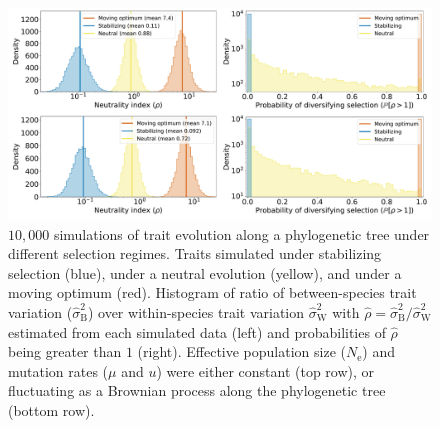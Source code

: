 \documentclass{article}
\newcommand{\Ne}{N_{\text{e}}}
\newcommand{\MutationRatePheno}{\mu}
\newcommand{\MutationRateNuc}{u}
\newcommand{\RateBetween}{\sigma^2_{\mathrm{B}}}
\newcommand{\RateWhithin}{\sigma^2_{\mathrm{W}}}
\newcommand{\EstRateBetween}{\widehat{\sigma}^2_{\mathrm{B}}}
\newcommand{\EstRateWhithin}{\widehat{\sigma}^2_{\mathrm{W}}}
\newcommand{\NI}{\rho}
\newcommand{\EstNI}{\widehat{\rho}}
\providecommand{\DIFaddtex}[1]{{\protect\color{blue}\uwave{#1}}} %
\providecommand{\DIFdeltex}[1]{{\protect\color{red}\sout{#1}}}                      %
\providecommand{\DIFaddFL}[1]{\DIFadd{#1}} %
\providecommand{\DIFdelFL}[1]{\DIFdel{#1}} %
\providecommand{\DIFaddbeginFL}{} %
\providecommand{\DIFaddendFL}{} %
\providecommand{\DIFdelbeginFL}{} %
\providecommand{\DIFdelendFL}{} %
\providecommand{\DIFadd}[1]{\texorpdfstring{\DIFaddtex{#1}}{#1}} %
\providecommand{\DIFdel}[1]{\texorpdfstring{\DIFdeltex{#1}}{}} %
\newcommand{\DIFscaledelfig}{0.5}
\newlength{\DIFdelgraphicswidth} %
\newlength{\DIFdelgraphicsheight} %
\newcommand{\DIFaddincludegraphics}[2][]{{\color{blue}\fbox{\DIFOincludegraphics[#1]{#2}}}} %
\newcommand{\DIFdelincludegraphics}[2][]{%
\sbox{\DIFdelgraphicsbox}{\DIFOincludegraphics[#1]{#2}}%
\settoboxwidth{\DIFdelgraphicswidth}{\DIFdelgraphicsbox} %
\settoboxtotalheight{\DIFdelgraphicsheight}{\DIFdelgraphicsbox} %
\scalebox{\DIFscaledelfig}{%
\parbox[b]{\DIFdelgraphicswidth}{\usebox{\DIFdelgraphicsbox}\\[-\baselineskip] \rule{\DIFdelgraphicswidth}{0em}}\llap{\resizebox{\DIFdelgraphicswidth}{\DIFdelgraphicsheight}{%
\setlength{\unitlength}{\DIFdelgraphicswidth}%
\begin{picture}(1,1)%
\thicklines\linethickness{2pt} %
{\color[rgb]{1,0,0}\put(0,0){\framebox(1,1){}}}%
{\color[rgb]{1,0,0}\put(0,0){\line( 1,1){1}}}%
{\color[rgb]{1,0,0}\put(0,1){\line(1,-1){1}}}%
\end{picture}%
}\hspace*{3pt}}} %
} %
\DeclareRobustCommand{\DIFaddbeginFL}{\DIFOaddbeginFL \let\includegraphics\DIFaddincludegraphics} %
\DeclareRobustCommand{\DIFaddendFL}{\DIFOaddendFL \let\includegraphics\DIFOincludegraphics} %
\DeclareRobustCommand{\DIFdelbeginFL}{\DIFOdelbeginFL \let\includegraphics\DIFdelincludegraphics} %
\DeclareRobustCommand{\DIFdelendFL}{\DIFOaddendFL \let\includegraphics\DIFOincludegraphics} %
\begin{document}
\begin{figure}[!ht]
    \centering
    \includegraphics[width=\textwidth, page=1] {figure3}
    \caption{
        $10,000$ simulations of trait evolution along a phylogenetic tree under different selection regimes.
        Traits simulated under stabilizing selection (blue), under a neutral evolution (yellow), and under a moving optimum (red).
        Histogram of ratio of between-species trait variation (\DIFdelbeginFL \DIFdelFL{$\EstRateBetween$}\DIFdelendFL \DIFaddbeginFL \DIFaddFL{$\RateBetween$}\DIFaddendFL ) over within-species trait variation \DIFdelbeginFL \DIFdelFL{$\EstRateWhithin$ }\DIFdelendFL \DIFaddbeginFL \DIFaddFL{$\RateWhithin$ }\DIFaddendFL with \DIFdelbeginFL \DIFdelFL{$\EstNI = \EstRateBetween / \EstRateWhithin$ }\DIFdelendFL \DIFaddbeginFL \DIFaddFL{$\NI = \RateBetween / \RateWhithin$ }\DIFaddendFL estimated from each simulated data (left) and probabilities of \DIFdelbeginFL \DIFdelFL{$\EstNI$ }\DIFdelendFL \DIFaddbeginFL \DIFaddFL{$\NI$ }\DIFaddendFL being greater than $1$ (right).
        Effective population size ($\Ne$) and mutation rates ($\MutationRatePheno$ and $\MutationRateNuc$) were either constant (top row), or fluctuating as a Brownian process along the phylogenetic tree (bottom row).
    }
    \label{fig:results-simulations}
\end{figure}
\end{document}
